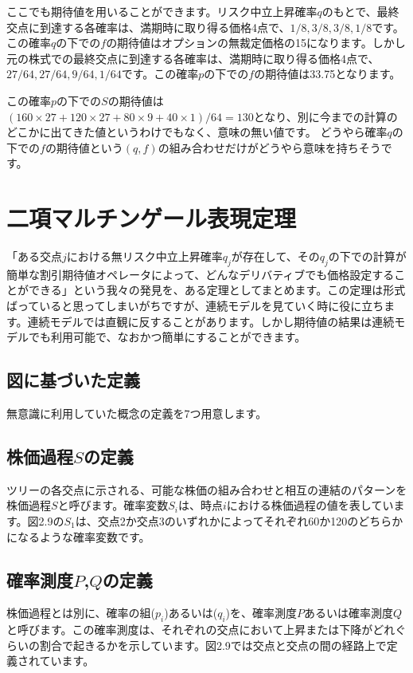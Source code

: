 \documentclass[uplatex,a4j,12pt,dvipdfmx]{jsarticle}
\begin{document}
ここでも期待値を用いることができます。リスク中立上昇確率$q$のもとで、最終交点に到達する各確率は、満期時に取り得る価格4点で、$1/8, 3/8, 3/8, 1/8$です。この確率$q$の下での$f$の期待値はオプションの無裁定価格の15になります。しかし元の株式での最終交点に到達する各確率は、満期時に取り得る価格4点で、$27/64, 27/64, 9/64, 1/64$です。この確率$p$の下での$f$の期待値は33.75となります。

この確率$p$の下での$S$の期待値は$(160 \times 27+120 \times 27+80 \times 9+40 \times 1)/64=130$となり、別に今までの計算のどこかに出てきた値というわけでもなく、意味の無い値です。
どうやら確率$q$の下での$f$の期待値という$(q,f)$の組み合わせだけがどうやら意味を持ちそうです。


\section{二項マルチンゲール表現定理}
「ある交点$j$における無リスク中立上昇確率$q_j$が存在して、その$q_j$の下での計算が簡単な割引期待値オペレータによって、どんなデリバティブでも価格設定することができる」という我々の発見を、ある定理としてまとめます。この定理は形式ばっていると思ってしまいがちですが、連続モデルを見ていく時に役に立ちます。連続モデルでは直観に反することがあります。しかし期待値の結果は連続モデルでも利用可能で、なおかつ簡単にすることができます。

\subsection{図に基づいた定義}
無意識に利用していた概念の定義を7つ用意します。

\subsection{株価過程$S$の定義}
ツリーの各交点に示される、可能な株価の組み合わせと相互の連結のパターンを株価過程$S$と呼びます。確率変数$S_i$は、時点$i$における株価過程の値を表しています。図2.9の$S_1$は、交点2か交点3のいずれかによってそれぞれ60か120のどちらかになるような確率変数です。

\subsection{確率測度$P$,$Q$の定義}
株価過程とは別に、確率の組($p_i$)あるいは($q_i$)を、確率測度$P$あるいは確率測度$Q$と呼びます。この確率測度は、それぞれの交点において上昇または下降がどれぐらいの割合で起きるかを示しています。図2.9では交点と交点の間の経路上で定義されています。
\end{document}
